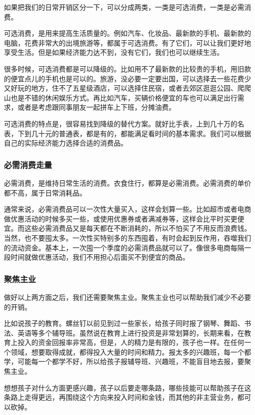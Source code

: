 如果把我们的日常开销区分一下，可以分成两类，一类是可选消费，一类是必需消费。

可选消费，是用来提高生活质量的。例如汽车、化妆品、最新款的手机、最新款的电脑，花费非常大的出境旅游等，都属于可选消费。有了它们，可以让我们更好地享受生活。但是如果经济能力达不到，没有它们，我们也可以继续生活。

很多时候，可选消费都是可以降级的。比如用不了最新款的比较贵的手机，用旧款的便宜点儿的手机也是可以的。旅游，没必要一定要出国，可以选择去一些花费少又好玩的地方，住不了五星级酒店，可以选择住民宿，或者去郊区逛逛公园、爬爬山也是不错的休闲娱乐方式。再比如汽车，买辆价格便宜的车也可以满足出行需求，或者是考虑跟同事朋友一起拼车上下班，分摊油费。

可选消费的特点是，很容易找到降级的替代方案。就好比手表，上到几十万的名表，下到几十元的普通表，都是有的，都能满足看时间的基本需求。我们可以根据自己的实际经济能力选择合适的消费品。

\subsubsection{必需消费走量}

必需消费，是维持日常生活的消费。衣食住行，都算是必需消费。必需消费的单价都不高，属于日常消耗品。

通常来说，必需消费品可以一次性大量买入，这样会划算一些。比如超市或者电商做优惠活动的时候多买一些，或使用优惠券或者满减券等，这样会比平时买更便宜。而这些必需消费品又是每天都在不断消耗的，所以不怕买了不用反而浪费钱。当然，也不要囤太多。一次性买特别多的东西囤着，有时会起到反作用，吞噬我们的流动资金。基本上，一次囤一个季度的必需消费品就可以了。像很多电商每隔一段时间就做优惠活动，我们不用担心后面买不到便宜的商品。

\subsubsection{聚焦主业}

做好以上两方面之后，我们还需要聚焦主业。聚焦主业也可以帮助我们减少不必要的开销。

比如说孩子的教育。螺丝钉以前见到过一些家长，给孩子同时报了钢琴、舞蹈、书法、英语等多个辅导班。虽然说在教育上进行投资是非常划算的，长期来看，在教育上投入的资金回报率非常高，但是，人的精力是有限的，孩子也一样。在任何一个领域，想要取得成就，都得投入大量的时间和精力。报太多的兴趣班，每一个都学，可能每一个都学不好，所以给孩子报辅导班、兴趣班，不能盲目地去报，要聚焦主业。

想想孩子对什么方面更感兴趣，孩子以后要走哪条路，哪些技能可以帮助孩子在这条路上走得更远，再围绕这个方向来投入时间和金钱，而其他的非主营业务，都可以砍掉。

